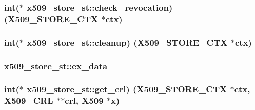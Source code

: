 \subsubsection[{\texorpdfstring{check\+\_\+revocation}{check_revocation}}]{\setlength{\rightskip}{0pt plus 5cm}int($\ast$ x509\+\_\+store\+\_\+st\+::check\+\_\+revocation) ({\bf X509\+\_\+\+S\+T\+O\+R\+E\+\_\+\+C\+TX} $\ast$ctx)}\hypertarget{structx509__store__st_af48617053d5abd22e6f0bb877a3801d9}{}\label{structx509__store__st_af48617053d5abd22e6f0bb877a3801d9}
\subsubsection[{\texorpdfstring{cleanup}{cleanup}}]{\setlength{\rightskip}{0pt plus 5cm}int($\ast$ x509\+\_\+store\+\_\+st\+::cleanup) ({\bf X509\+\_\+\+S\+T\+O\+R\+E\+\_\+\+C\+TX} $\ast$ctx)}\hypertarget{structx509__store__st_a47f8b84ffcf429407df15bf5b896f29a}{}\label{structx509__store__st_a47f8b84ffcf429407df15bf5b896f29a}
\subsubsection[{\texorpdfstring{ex\+\_\+data}{ex_data}}]{ x509\+\_\+store\+\_\+st\+::ex\+\_\+data}\hypertarget{structx509__store__st_acb8c355184a6de1d30c4a2cee60f0839}{}\label{structx509__store__st_acb8c355184a6de1d30c4a2cee60f0839}
\subsubsection[{\texorpdfstring{get\+\_\+crl}{get_crl}}]{\setlength{\rightskip}{0pt plus 5cm}int($\ast$ x509\+\_\+store\+\_\+st\+::get\+\_\+crl) ({\bf X509\+\_\+\+S\+T\+O\+R\+E\+\_\+\+C\+TX} $\ast$ctx, {\bf X509\+\_\+\+C\+RL} $\ast$$\ast$crl, {\bf X509} $\ast$x)}\hypertarget{structx509__store__st_a805b166e3886e35dac65014a43752c17}{}\label{structx509__store__st_a805b166e3886e35dac65014a43752c17}
